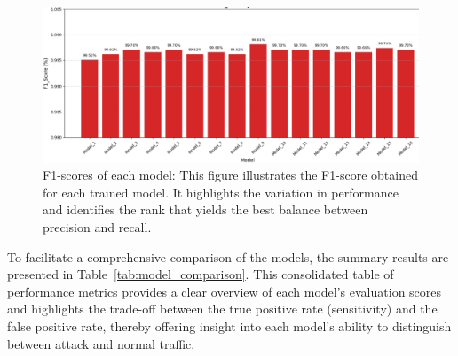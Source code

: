 \documentclass[preprint,12pt,authoryear]{elsarticle}
\begin{document}
\begin{figure}[H]
    \centering
    \includegraphics[width=1\linewidth]{F1-score.png}
    \caption{F1-scores of each model: This figure illustrates the F1-score obtained for each trained model. It highlights the variation in performance and identifies the rank that yields the best balance between precision and recall.}
    \label{fig:f1}
\end{figure}
To facilitate a comprehensive comparison of the models, the summary results are presented in Table~\ref{tab:model_comparison}. This consolidated table of performance metrics provides a clear overview of each model’s evaluation scores and highlights the trade-off between the true positive rate (sensitivity) and the false positive rate, thereby offering insight into each model’s ability to distinguish between attack and normal traffic.
\end{document}
